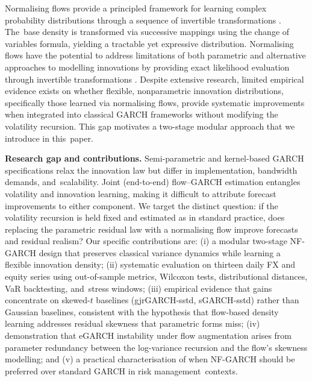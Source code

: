 \documentclass[risks,article,accept,pdftex,moreauthors]{Definitions/mdpi}
\begin{document}
Normalising flows provide a principled framework for learning complex probability distributions through a sequence of invertible transformations \citep{rezende2015variational, mongwe2025bayesian}. The~base density is transformed via successive mappings using the change of variables formula, yielding a tractable yet expressive distribution. Normalising flows have the potential to address limitations of both parametric and alternative approaches to modelling innovations by providing exact likelihood evaluation through invertible transformations \citep{rezende2015variational, papamakarios2021normalizing, seitz2022garchnf}. Despite extensive research, limited empirical evidence exists on whether flexible, nonparametric innovation distributions, specifically those learned via normalising flows, provide systematic improvements when integrated into classical GARCH frameworks without modifying the volatility recursion. This gap motivates a two-stage modular approach that we introduce in this~paper.

\textbf{{Research} %
 gap and contributions.} Semi-parametric and kernel-based GARCH specifications \citep{engle1993measuring, hansen2004nonparametric} relax the innovation law but differ in implementation, bandwidth demands, and~scalability. Joint (end-to-end) flow--GARCH estimation \citep{seitz2022garchnf} entangles volatility and innovation learning, making it difficult to attribute forecast improvements to either component. We target the distinct question: if the volatility recursion is held fixed and estimated as in standard practice, does replacing the parametric residual law with a normalising flow improve forecasts and residual realism? Our specific contributions are: (i) a modular two-stage NF-GARCH design that preserves classical variance dynamics while learning a flexible innovation density; (ii) systematic evaluation on thirteen daily FX and equity series using out-of-sample metrics, Wilcoxon tests, distributional distances, VaR backtesting, and~stress windows; (iii) empirical evidence that gains concentrate on skewed-$t$ baselines (gjrGARCH-sstd, sGARCH-sstd) rather than Gaussian baselines, consistent with the hypothesis that flow-based density learning addresses residual skewness that parametric forms miss; (iv) demonstration that eGARCH instability under flow augmentation arises from parameter redundancy between the log-variance recursion and the flow's skewness modelling; and (v) a practical characterisation of when NF-GARCH should be preferred over standard GARCH in risk management~contexts.
\end{document}
